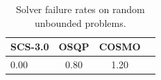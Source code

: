 \begin{table}
\centering
\caption{Solver failure rates on random unbounded problems.}
\label{t-random unbounded-failure}
\begin{tabular}{lccc}
\toprule
 SCS-3.0 &  OSQP &  COSMO \\
\midrule
    0.00 &  0.80 &   1.20 \\
\bottomrule
\end{tabular}
\end{table}
